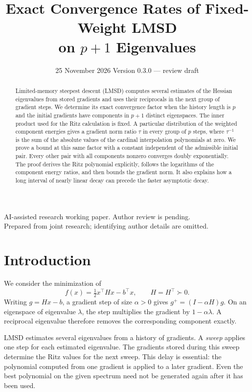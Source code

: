 \documentclass[11pt,a4paper]{article}
\title{Exact Convergence Rates of Fixed-Weight LMSD\\ on \(p+1\) Eigenvalues}
\author{}
\date{25 November 2026 \quad\textbullet\quad Version 0.3.0 --- review draft}
\numberwithin{equation}{section}
\begin{document}
\maketitle
\begin{center}
\small AI-assisted research working paper. Author review is pending.\\
Prepared from joint research; identifying author details are omitted.
\end{center}
\begin{abstract}
Limited-memory steepest descent (LMSD) computes several estimates of the Hessian eigenvalues from stored gradients and uses their reciprocals in the next group of gradient steps. We determine its exact convergence factor when the history length is \(p\) and the initial gradients have components in \(p+1\) distinct eigenspaces. The inner product used for the Ritz calculation is fixed. A particular distribution of the weighted component energies gives a gradient norm ratio \(\tau\) in every group of \(p\) steps, where \(\tau^{-1}\) is the sum of the absolute values of the cardinal interpolation polynomials at zero. We prove a bound at this same factor with a constant independent of the admissible initial pair. Every other pair with all components nonzero converges doubly exponentially. The proof derives the Ritz polynomial explicitly, follows the logarithms of the component energy ratios, and then bounds the gradient norm. It also explains how a long interval of nearly linear decay can precede the faster asymptotic decay.
\end{abstract}

\section{Introduction}\label{sec:intro}
We consider the minimization of
\[
 f(x)=\tfrac12x^\top Hx-b^\top x,\qquad H=H^\top\succ0.
\]
Writing \(g=Hx-b\), a gradient step of size \(\alpha>0\) gives
\(g^+=(I-\alpha H)g\). On an eigenspace of eigenvalue \(\lambda\), the
step multiplies the gradient by \(1-\alpha\lambda\). A reciprocal
eigenvalue therefore removes the corresponding component exactly.

LMSD estimates several eigenvalues from a history of gradients. A
\emph{sweep} applies one step for each estimated eigenvalue. The
gradients stored during this sweep determine the Ritz values for the
next sweep. This delay is essential: the polynomial computed from one
gradient is applied to a later gradient. Even the best polynomial on
the given spectrum need not be generated again after it has been used.
\end{document}
